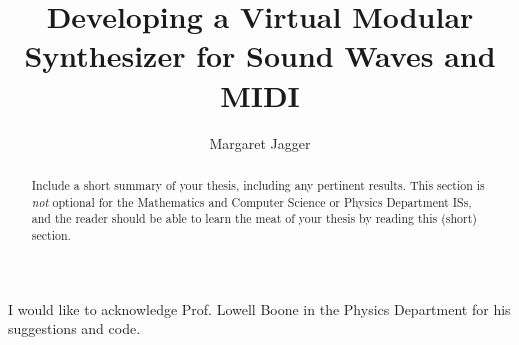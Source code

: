\documentclass[10pt,palatino,code,picins,kaukecopyright,openright,woolshort,dropcaps,verbatim,index,euler]{woosterthesis}
\title{Developing a Virtual Modular Synthesizer for Sound Waves and MIDI}
\author{Margaret Jagger}
\begin{document}
%
%

\frontmatter
\maketitle
\clearpage\thispagestyle{empty}\null\clearpage
\disscopyright 

%                                                                                       
%                                                                                       

\begin{abstract}
Include a short summary of your thesis, including any pertinent results.  This section is \emph{not} optional for the Mathematics and Computer Science or Physics Department ISs, and the reader should be able to learn the meat of your thesis by reading this (short) section.
\end{abstract}

%                                                                                       
%                                                                                       

\dedication{This work is dedicated to the future generations of Wooster students.}


%                                                                                       
%                                                                                       

\begin{acknowl}  
I would like to acknowledge Prof. Lowell Boone in the Physics Department for his suggestions and code.
\end{acknowl}
\end{document}
